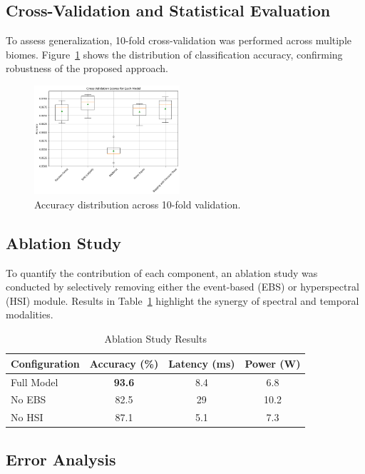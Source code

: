 \documentclass[conference]{IEEEtran}
\begin{document}
\subsection{Cross-Validation and Statistical Evaluation}

To assess generalization, 10-fold cross-validation was performed across multiple biomes. Figure~\ref{fig:performance_chart} shows the distribution of classification accuracy, confirming robustness of the proposed approach.

\begin{figure}[H]
    \centering
    \includegraphics[width=0.48\textwidth]{Accuracy.png}
    \caption{Accuracy distribution across 10-fold validation.}
    \label{fig:performance_chart}
\end{figure}

\subsection{Ablation Study}

To quantify the contribution of each component, an ablation study was conducted by selectively removing either the event-based (EBS) or hyperspectral (HSI) module. Results in Table~\ref{tab:ablation} highlight the synergy of spectral and temporal modalities.

\begin{table}[H]
\centering
\caption{Ablation Study Results}
\label{tab:ablation}
\begin{tabular}{lccc}
\toprule
Configuration & Accuracy (\%) & Latency (ms) & Power (W) \\
\midrule
Full Model & \textbf{93.6} & 8.4 & 6.8 \\
No EBS & 82.5 & 29 & 10.2 \\
No HSI & 87.1 & 5.1 & 7.3 \\
\bottomrule
\end{tabular}
\end{table}

\subsection{Error Analysis}
\end{document}
